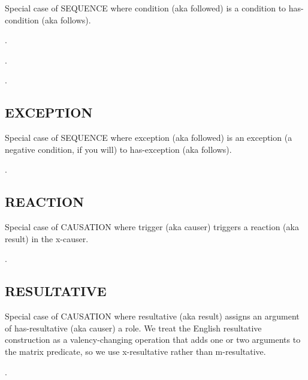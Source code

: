 \documentclass[a4paper]{article}
\newcommand{\fr}[1]{\textsf{#1}}
\newcommand{\rl}[1]{\textsf{#1}}
\begin{document}
Special case of \fr{SEQUENCE} where \rl{condition} (aka \rl{followed}) is a
condition to \rl{has-condition} (aka \rl{follows}).

\ex.

\ex.

\ex.


\newpage\subsection{ \fr{EXCEPTION}}
\label{sec:EXCEPTION}

Special case of \fr{SEQUENCE} where \rl{exception} (aka \rl{followed}) is an
exception (a negative condition, if you will) to \rl{has-exception} (aka \rl{follows}).

\ex.


\newpage\subsection{ \fr{REACTION}}
\label{sec:REACTION}

Special case of \fr{CAUSATION} where \rl{trigger} (aka \rl{causer}) triggers a
\rl{reaction} (aka \rl{result}) in the \rl{x-causer}.

\ex.


\newpage\subsection{ \fr{RESULTATIVE}}
\label{sec:RESULTATIVE}

Special case of \fr{CAUSATION} where \rl{resultative} (aka \rl{result}) assigns
an argument of \rl{has-resultative} (aka \rl{causer}) a role. We treat the
English resultative construction as a valency-changing operation that adds one
or two arguments to the matrix predicate, so we use \rl{x-resultative} rather
than \rl{m-resultative}.

\ex.
\end{document}
